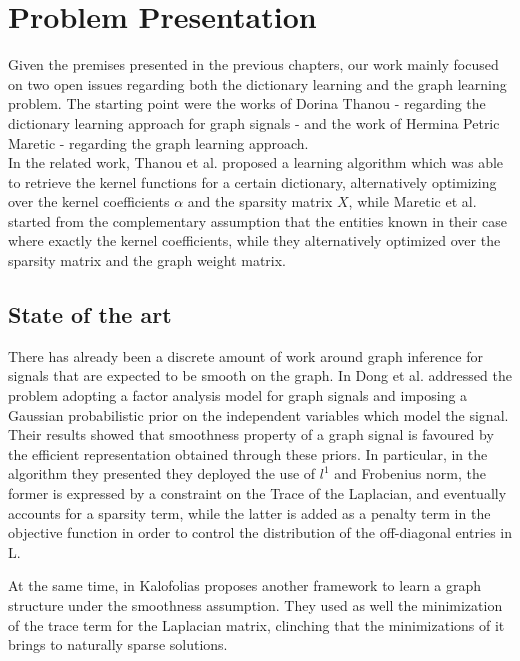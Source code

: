 \chapter{Problem Presentation}
Given the premises presented in the previous chapters, our work mainly focused on two open issues regarding both the dictionary learning and the graph learning problem. The starting point were the works of Dorina Thanou -  regarding the dictionary learning approach for graph signals - and the work of Hermina Petric Maretic - regarding the graph learning approach.\\
In the related work, Thanou et al. proposed a learning algorithm which was able to retrieve the kernel functions for a certain dictionary, alternatively optimizing over the kernel coefficients $\alpha$ and the sparsity matrix $X$, while Maretic et al. started from the complementary assumption that the entities known in their case where exactly the kernel coefficients, while they alternatively optimized over the sparsity matrix and the graph weight matrix.

\section{State of the art}
There has already been a discrete amount of work around graph inference for signals that are expected to be smooth on the graph.  In \cite{Dong2016} Dong et al. addressed the problem adopting a factor analysis model for graph signals and imposing a Gaussian probabilistic prior on the independent variables which model the signal. Their results showed that smoothness property of a graph signal is favoured by the efficient representation obtained through these priors. In particular, in the algorithm they presented they deployed the use of $l^1$ and Frobenius norm, the former is expressed by a constraint on the Trace of the Laplacian, and eventually accounts for a sparsity term, while the latter is added as a penalty term in the objective function in order to control the distribution of the off-diagonal entries in L.

At the same time, in \cite{Kalofolias2016} Kalofolias proposes another framework to learn a graph structure under the smoothness assumption. They used as well the minimization of the trace term for the Laplacian matrix, clinching that the minimizations of it brings to naturally sparse solutions.

